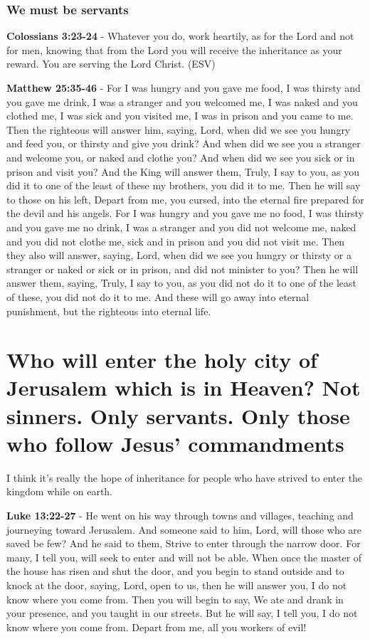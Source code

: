 \documentclass[11pt]{article}
\begin{document}
\subsubsection{We must be servants}
\label{sec:org0085f6d}
\textbf{Colossians 3:23-24} -  Whatever you do, work heartily, as for the Lord and not for men, knowing that from the Lord you will receive the inheritance as your reward. You are serving the Lord Christ.  (ESV)

\textbf{Matthew 25:35-46} - For I was hungry and you gave me food, I was thirsty and you gave me drink, I was a stranger and you welcomed me, I was naked and you clothed me, I was sick and you visited me, I was in prison and you came to me. Then the righteous will answer him, saying, Lord, when did we see you hungry and feed you, or thirsty and give you drink? And when did we see you a stranger and welcome you, or naked and clothe you? And when did we see you sick or in prison and visit you? And the King will answer them, Truly, I say to you, as you did it to one of the least of these my brothers, you did it to me. Then he will say to those on his left, Depart from me, you cursed, into the eternal fire prepared for the devil and his angels. For I was hungry and you gave me no food, I was thirsty and you gave me no drink, I was a stranger and you did not welcome me, naked and you did not clothe me, sick and in prison and you did not visit me. Then they also will answer, saying, Lord, when did we see you hungry or thirsty or a stranger or naked or sick or in prison, and did not minister to you? Then he will answer them, saying, Truly, I say to you, as you did not do it to one of the least of these, you did not do it to me. And these will go away into eternal punishment, but the righteous into eternal life.

\section{Who will enter the holy city of Jerusalem which is in Heaven? Not sinners. Only servants. Only those who follow Jesus' commandments}
\label{sec:org667cafa}
I think it's really the hope of inheritance for people who have strived to enter the kingdom while on earth.

\textbf{Luke 13:22-27} - He went on his way through towns and villages, teaching and journeying toward Jerusalem. And someone said to him, Lord, will those who are saved be few? And he said to them, Strive to enter through the narrow door. For many, I tell you, will seek to enter and will not be able. When once the master of the house has risen and shut the door, and you begin to stand outside and to knock at the door, saying, Lord, open to us, then he will answer you, I do not know where you come from. Then you will begin to say, We ate and drank in your presence, and you taught in our streets. But he will say, I tell you, I do not know where you come from. Depart from me, all you workers of evil!
\end{document}
